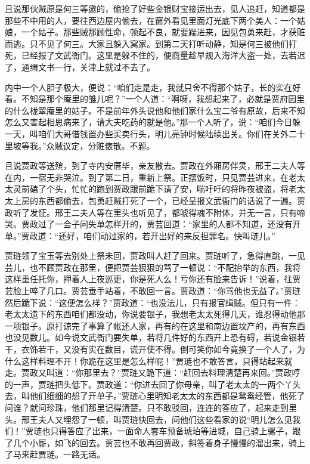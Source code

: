 \begin{parag}
    且说那伙贼原是何三等邀的，偷抢了好些金银财宝接运出去，见人追赶，知道都是那些不中用的人，要往西边屋内偷去，在窗外看见里面灯光底下两个美人：一个姑娘，一个姑子。那些贼那顾性命，顿起不良，就要踹进来，因见包勇来赶，才获赃而逃。只不见了何三。大家且躲入窝家。到第二天打听动静，知是何三被他们打死，已经报了文武衙门。这里是躲不住的，便商量趁早规入海洋大盗一处，去若迟了，通缉文书一行，关津上就过不去了。
\end{parag}


\begin{parag}
    内中一个人胆子极大，便说：“咱们走是走，我就只舍不得那个姑子，长的实在好看。不知是那个庵里的雏儿呢？”一个人道：“啊呀，我想起来了，必就是贾府园里的什么栊翠庵里的姑子。不是前年外头说他和他们家什么宝二爷有原故，后来不知怎么又害起相思病来了，请大夫吃药的就是他。”那一个人听了，说：“咱们今日躲一天，叫咱们大哥借钱置办些买卖行头，明儿亮钟时候陆续出关。你们在关外二十里坡等我。”众贼议定，分赃俵散。不题。
\end{parag}


\begin{parag}
    且说贾政等送殡，到了寺内安厝毕，亲友散去。贾政在外厢房伴灵，邢王二夫人等在内，一宿无非哭泣。到了第二日，重新上祭。正摆饭时，只见贾芸进来，在老太太灵前磕了个头，忙忙的跑到贾政跟前跪下请了安，喘吁吁的将昨夜被盗，将老太太上房的东西都偷去，包勇赶贼打死了一个，已经呈报文武衙门的话说了一遍。贾政听了发怔。邢王二夫人等在里头也听见了，都唬得魂不附体，并无一言，只有啼哭。贾政过了一会子问失单怎样开的，贾芸回道：“家里的人都不知道，还没有开单。”贾政道：“还好，咱们动过家的，若开出好的来反担罪名。快叫琏儿。”
\end{parag}


\begin{parag}
    贾琏领了宝玉等去别处上祭未回，贾政叫人赶了回来。贾琏听了，急得直跳，一见芸儿，也不顾贾政在那里，便把贾芸狠狠的骂了一顿说：“不配抬举的东西，我将这样重任托你，押着人上夜巡更，你是死人么！亏你还有脸来告诉！”说着，往贾芸脸上啐了几口。贾芸垂手站着，不敢回一言。贾政道：“你骂他也无益了。”贾琏然后跪下说：“这便怎么样？”贾政道：“也没法儿，只有报官缉贼。但只有一件：老太太遗下的东西咱们都没动，你说要银子，我想老太太死得几天，谁忍得动他那一项银子。原打谅完了事算了帐还人家，再有的在这里和南边置坟产的，再有东西也没见数儿。如今说文武衙门要失单，若将几件好的东西开上恐有碍，若说金银若干，衣饰若干，又没有实在数目，谎开使不得。倒可笑你如今竟换了一个人了，为什么这样料理不开！你跪在这里是怎么样呢！”贾琏也不敢答言，只得站起来就走。贾政又叫道：“你那里去？”贾琏又跪下道：“赶回去料理清楚再来回。”贾政哼的一声，贾琏把头低下。贾政道：“你进去回了你母亲，叫了老太太的一两个丫头去，叫他们细细的想了开单子。”贾琏心里明知老太太的东西都是鸳鸯经管，他死了问谁？就问珍珠，他们那里记得清楚。只不敢驳回，连连的答应了，起来走到里头。邢王夫人又埋怨了一顿，叫贾琏快回去，问他们这些看家的说“明儿怎么见我们！”贾琏也只得答应了出来，一面命人套车预备琥珀等进城，自己骑上骡子，跟了几个小厮，如飞的回去。贾芸也不敢再回贾政，斜签着身子慢慢的溜出来，骑上了马来赶贾琏。一路无话。
\end{parag}


